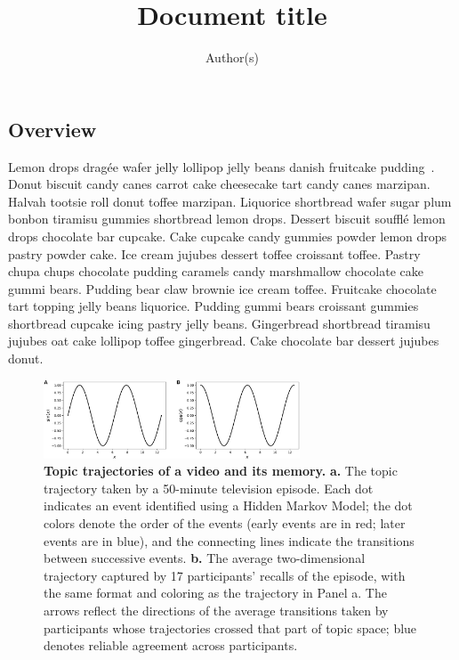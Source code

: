\documentclass[11pt]{extarticle}
\title{Document title}
\author{Author(s)}
\begin{document}
\subsection*{Overview}
Lemon drops dragée wafer jelly lollipop jelly beans danish fruitcake pudding~\citep{Mann21a}. Donut biscuit candy canes carrot cake cheesecake tart candy canes marzipan. Halvah tootsie roll donut toffee marzipan. Liquorice shortbread wafer sugar plum bonbon tiramisu gummies shortbread lemon drops. Dessert biscuit soufflé lemon drops chocolate bar cupcake. Cake cupcake candy gummies powder lemon drops pastry powder cake. Ice cream jujubes dessert toffee croissant toffee. Pastry chupa chups chocolate pudding caramels candy marshmallow chocolate cake gummi bears. Pudding bear claw brownie ice cream toffee. Fruitcake chocolate tart topping jelly beans liquorice. Pudding gummi bears croissant gummies shortbread cupcake icing pastry jelly beans. Gingerbread shortbread tiramisu jujubes oat cake lollipop toffee gingerbread. Cake chocolate bar dessert jujubes donut.

\begin{figure}
    \vspace{-35pt}
      \begin{center}
        \includegraphics[width=3in]{figs/trig}
      \end{center}
    \vspace{-24pt}
      \caption{\footnotesize \textbf{Topic trajectories of a video and its memory.}  \textbf{a.} The topic trajectory taken by a 50-minute television episode.  Each dot indicates an event identified using a Hidden Markov Model; the dot colors denote the order of the events (early events are in red; later events are in blue), and the connecting lines indicate the transitions between successive events.  \textbf{b.} The average two-dimensional trajectory captured by 17 participants' recalls of the episode, with the same format and coloring as the trajectory in Panel a. The arrows reflect the directions of the average transitions taken by participants whose trajectories crossed that part of topic space; blue denotes reliable agreement across participants.}
      \label{fig:trajectories}
\end{figure}
\end{document}
